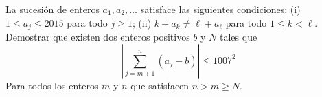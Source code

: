 La sucesión de enteros $a_1,a_2,\dots$ satisface las siguientes condiciones: \newline 
(i) $1\leq a_j \leq 2015$ para todo $j\geq 1$; \newline 
(ii) $k+a_k\neq\ell+a_{\ell}$ para todo $1\leq k \lt \ell$. \newline 
Demostrar que existen dos enteros positivos $b$ y $N$ tales que 
\[\left\vert\sum_{j=m+1}^n(a_j-b)\right\vert\le1007^2\]
Para todos los enteros $m$ y $n$ que satisfacen $n\gt m\geq N$.